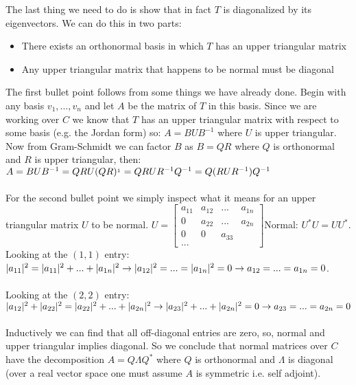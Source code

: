 \documentclass{article}
\begin{document}
The last thing we need to do is show that in fact $T$ is diagonalized by its eigenvectors. We can do this in two parts: 
\begin{itemize}
    \item There exists an orthonormal basis in which $T$ has an upper triangular matrix 
    \item Any upper triangular matrix that happens to be normal must be diagonal 
\end{itemize}
The first bullet point follows from some things we have already done. Begin with any basis $v_1, ..., v_n$ and let $A$ be the matrix of $T$ in this basis. Since we are working over $C$ we know that $T$ has an upper triangular matrix with respect to some basis (e.g. the Jordan form) so: $A = BUB^{-1}$ where $U$ is upper triangular. Now from Gram-Schmidt we can factor $B$ as $B = QR$ where $Q$ is orthonormal and $R$ is upper triangular, then: \\
$A = BUB^{-1} \\
= QR U (QR)^{_1}\\
= QR U R^{-1} Q^{-1}\\
= Q (RUR^{-1})Q^{-1}$\\\\
For the second bullet point we simply inspect what it means for an upper triangular matrix $U$ to be normal. $U = \begin{bmatrix}
a_{11} & a_{12} & ... & a_{1n}\\ 0 & a_{22} & ... & a_{2n} \\ 0 & 0 & a_{33} \\ ...
\end{bmatrix} 
$Normal: $U^* U = UU^* $. Looking at the $(1,1)$ entry: \\
$|a_{11}|^2 = |a_{11}|^2 + ... + |a_{1n}|^2 \\
\rightarrow |a_{12}| ^ 2 = ... = |a_{1n}|^2 = 0 \\
\rightarrow a_{12} = ... = a_{1n} = 0$. \\\\
Looking at the $(2,2)$ entry: \\
$|a_{12}|^2 + |a_{22}|^2 = |a_{22}|^2 + ... + |a_{2n}|^2 \\
\rightarrow |a_{23}|^2 + ... + |a_{2n}|^2 = 0\\
\rightarrow a_{23} = ... = a_{2n} = 0$\\\\
Inductively we can find that all off-diagonal entries are zero, so, normal and upper triangular implies diagonal. So we conclude that normal matrices over $C$ have the decomposition $A = Q \Lambda Q^*$ where $Q$ is orthonormal and $\Lambda$ is diagonal (over a real vector space one must assume $A$ is symmetric i.e. self adjoint). \\\\
\end{document}
